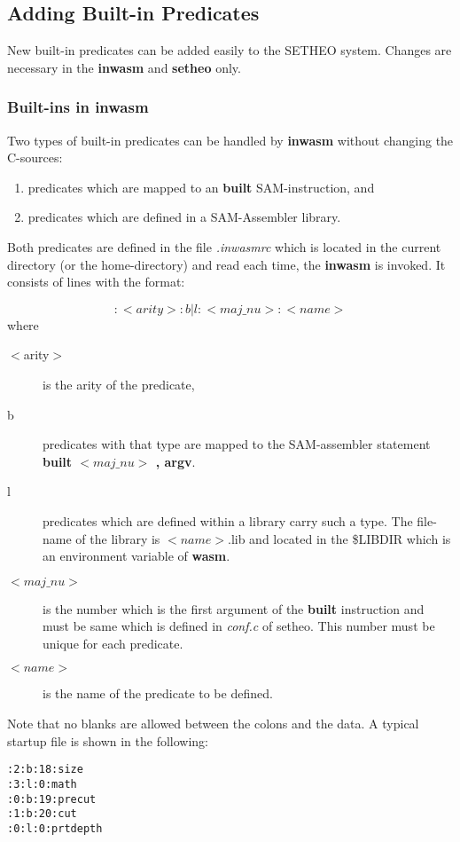 \subsection{Adding Built-in Predicates}

New built-in predicates can be added easily to the SETHEO system.
Changes are necessary in the {\bf inwasm} and {\bf setheo} only.

\subsubsection{Built-ins in inwasm}

Two types of built-in predicates can be handled by {\bf inwasm}
without changing the C-sources:
\begin{enumerate}
\item
predicates which are mapped to an {\bf built} SAM-instruction, and
\item
predicates which are defined in a SAM-Assembler library.
\end{enumerate}

Both predicates are defined in the file {\em .inwasmrc\/} which is
located in the current directory (or the home-directory)
and read each time, the {\bf inwasm} is invoked. It
consists of lines with the format:

\[ : <arity> : b|l : <maj\_nu> : <name> \]
where
\begin{description}
\item[$<$arity$>$]
is the arity of the predicate,
\item[b]
predicates with that type are mapped to the SAM-assembler
statement {\bf built  $<maj\_nu>$ , argv}.
\item[l]
predicates which are defined within a library carry such a type.
The file-name of the library is $<name>$.lib and located in
the \$LIBDIR which is an environment variable of {\bf wasm}.
\item[$<maj\_nu>$]
is the number which is the first argument of the {\bf built} instruction
and must be same which is defined in {\em conf.c\/} of setheo.
This number must be unique for each predicate.
\item[$<name>$]
is the name of the predicate to be defined.
\end{description}

Note that no blanks are allowed between the colons and the data.
A typical startup file is shown in the following:

\begin{verbatim}
:2:b:18:size
:3:l:0:math
:0:b:19:precut
:1:b:20:cut
:0:l:0:prtdepth
\end{verbatim}

